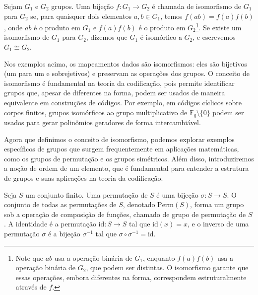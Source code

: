 \begin{definition}
  Sejam $G_1$ e $G_2$ grupos. Uma bijeção $f: G_1 \to G_2$ é chamada de
  isomorfismo de $G_1$ para $G_2$ se, para quaisquer dois elementos $a, b \in G_1$,
  temos $f(ab) = f(a)f(b)$, onde $ab$ é o produto em $G_1$ e
  $f(a)f(b)$ é o produto em $G_2$\footnote{
    Note que $ab$ usa a operação binária de $G_1$, enquanto $f(a)f(b)$
    usa a operação binária de $G_2$, que podem ser distintas.
    O isomorfismo garante que essas operações, embora
    diferentes na forma, correspondem estruturalmente através de $f$.}. 
  Se existe um isomorfismo de $G_1$ para
  $G_2$, dizemos que $G_1$ é isomórfico a $G_2$, e escrevemos $G_1 \cong G_2$.
\end{definition}



\begin{remark}
  Nos exemplos acima, os mapeamentos dados são isomorfismos: eles são bijetivos
  (um para um e sobrejetivos) e preservam as operações dos grupos. O conceito
  de isomorfismo é fundamental na teoria da codificação, pois permite
  identificar grupos que, apesar de diferentes na forma, podem ser usados de
  maneira equivalente em construções de códigos. Por exemplo, em códigos
  cíclicos sobre corpos finitos, grupos isomórficos ao grupo multiplicativo de
  $\mathbb{F}_q \setminus \{0\}$ podem ser usados para gerar polinômios
  geradores de forma intercambiável.
\end{remark}










Agora que definimos o conceito de isomorfismo, podemos explorar exemplos
específicos de grupos que surgem frequentemente em aplicações matemáticas, como
os grupos de permutação e os grupos simétricos. Além disso, introduziremos a
noção de ordem de um elemento, que é fundamental para entender a estrutura de
grupos e suas aplicações na teoria da codificação.

\begin{definition}
  Seja $S$ um conjunto finito. Uma permutação de $S$ é uma bijeção
  $\sigma: S \to S$. O conjunto de todas as permutações de $S$,
  denotado $\text{Perm}(S)$, forma um grupo sob a operação de composição de
  funções, chamado de grupo de permutação de $S$. A identidade é a
  permutação $\text{id}: S \to S$ tal que $\text{id}(x) = x$, e o
  inverso de uma permutação $\sigma$ é a bijeção $\sigma^{-1}$ tal que
  $\sigma \circ \sigma^{-1} = \text{id}$.
\end{definition}

